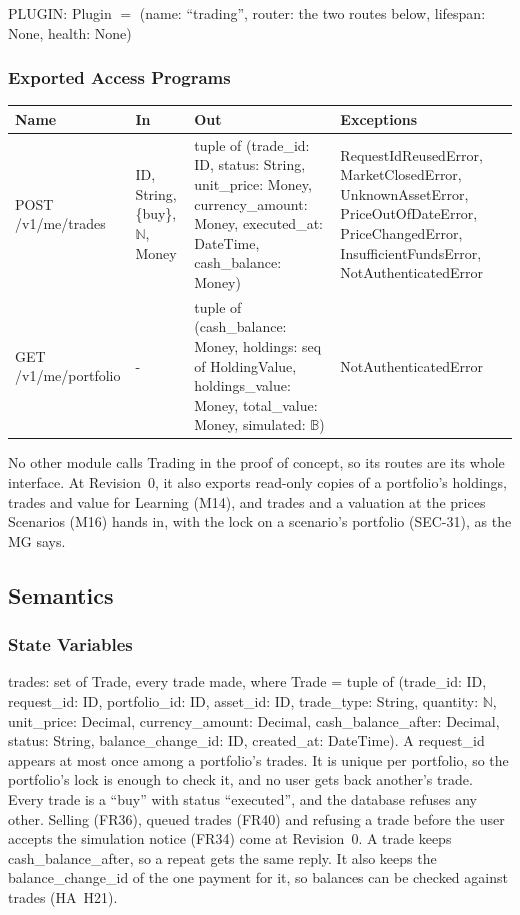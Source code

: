 \documentclass[12pt, titlepage]{article}
\begin{document}
PLUGIN: Plugin $=$ (name: ``trading'', router: the two routes below, lifespan:
None, health: None)

\subsubsection{Exported Access Programs}

\begin{center}
\begin{tabular}{>{\raggedright}p{3.2cm} >{\raggedright}p{2.1cm}
  >{\raggedright}p{5.2cm} >{\raggedright\arraybackslash}p{4.3cm}}
\toprule
\textbf{Name} & \textbf{In} & \textbf{Out} & \textbf{Exceptions} \\
\midrule
POST /v1/me/trades & ID, String, \{buy\}, $\mathbb{N}$, Money
  & tuple of (trade\_id: ID, status: String, unit\_price: Money,
  currency\_amount: Money, executed\_at: DateTime, cash\_balance: Money)
  & RequestIdReusedError, MarketClosedError, UnknownAssetError,
  PriceOutOfDateError, PriceChangedError, InsufficientFundsError,
  NotAuthenticatedError \\
GET /v1/me/portfolio & - & tuple of (cash\_balance: Money, holdings: seq of
  HoldingValue, holdings\_value: Money, total\_value: Money, simulated:
  $\mathbb{B}$) & NotAuthenticatedError \\
\bottomrule
\end{tabular}
\end{center}

\noindent No other module calls Trading in the proof of concept, so its routes
are its whole interface. At Revision~0, it also exports read-only copies of a
portfolio's holdings, trades and value for Learning (M14), and trades and a
valuation at the prices Scenarios (M16) hands in, with the lock on a
scenario's portfolio (SEC-31), as the MG says.

\subsection{Semantics}

\subsubsection{State Variables}

\noindent trades: set of Trade, every trade made, where Trade = tuple of
(trade\_id: ID, request\_id: ID, portfolio\_id: ID, asset\_id: ID,
trade\_type: String, quantity: $\mathbb{N}$, unit\_price: Decimal,
currency\_amount: Decimal, cash\_balance\_after: Decimal, status: String,
balance\_change\_id: ID, created\_at: DateTime). A request\_id appears at most
once among a portfolio's trades. It is unique per portfolio, so the
portfolio's lock is enough to check it, and no user gets back another's trade.
Every trade is a ``buy'' with status ``executed'', and the database refuses
any other. Selling (FR36), queued trades (FR40) and refusing a trade before the user
accepts the simulation notice (FR34) come at Revision~0. A trade
keeps cash\_balance\_after, so a repeat gets the same reply. It also keeps the
balance\_change\_id of the one payment for it, so balances can be checked
against trades (HA~H21).
\end{document}
